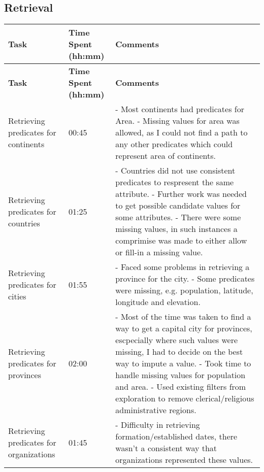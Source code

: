 \documentclass[11pt]{article}
\begin{document}
\subsection*{Retrieval}
\begin{longtable}{|p{3.9cm}|p{4.05cm}|p{6.8cm}|}
    \hline
    \textbf{Task} & \textbf{Time Spent (hh:mm)} & \textbf{Comments} \\ 
    \hline
    \endfirsthead
    
    \hline
    \textbf{Task} & \textbf{Time Spent (hh:mm)} & \textbf{Comments} \\ 
    \hline
    \endhead

    Retrieving predicates for continents & 00:45 & 
        - Most continents had predicates for Area. \newline
        - Missing values for area was allowed, as I could not find a path to any other predicates which could represent area of continents.
    \\
    \hline
    Retrieving predicates for countries & 01:25 & 
        - Countries did not use consistent predicates to respresent the same attribute. \newline
        - Further work was needed to get possible candidate values for some attributes. \newline
        - There were some missing values, in such instances a comprimise was made to either allow or fill-in a missing value.
    \\
    \hline
    Retrieving predicates for cities & 01:55 & 
        - Faced some problems in retrieving a province for the city. \newline
        - Some predicates were missing, e.g. population, latitude, longitude and elevation.
    \\
    \hline
    Retrieving predicates for provinces & 02:00 & 
        - Most of the time was taken to find a way to get a capital city for provinces, escpecially where such values were missing, I had to decide on the best way to impute a value.  \newline
        - Took time to handle missing values for population and area. \newline
        - Used existing filters from exploration to remove clerical/religious administrative regions.
    \\
    \hline
    Retrieving predicates for organizations & 01:45 & 
        - Difficulty in retrieving formation/established dates, there wasn't a consistent way that organizations represented these values.  \newline

\end{longtable}
\end{document}
